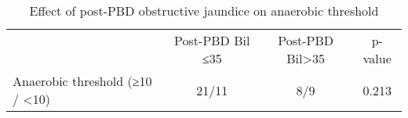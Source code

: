 \begin{sidewaystable}
	\caption{Effect of post-PBD obstructive jaundice on anaerobic threshold}
	\label{reg}
	\begin{tabular}{l c c c}
		& Post-PBD Bil ≤35 & Post-PBD Bil>35 & p-value \\
		Anaerobic threshold (≥10 / <10) & 21/11            & 8/9             & 0.213
	\end{tabular}
\end{sidewaystable}